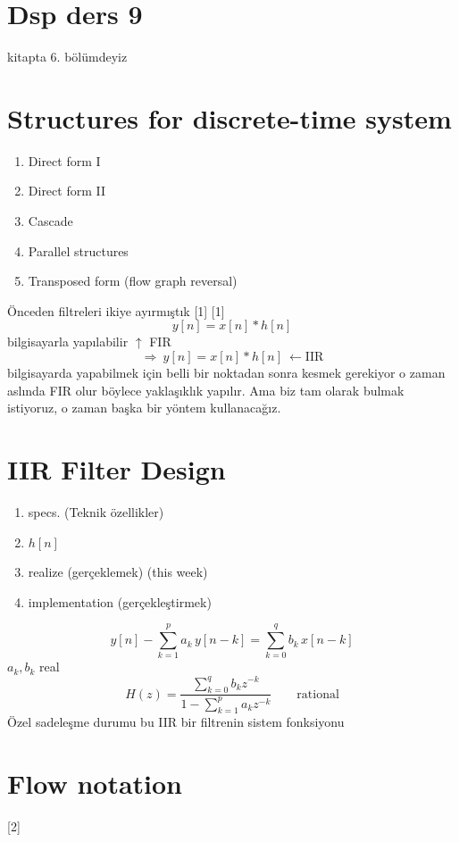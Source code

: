 \documentclass[11pt,a4paper]{article}
\begin{document}

\section{Dsp ders 9}
kitapta 6. bölümdeyiz

\section{Structures for discrete-time system}
\begin{enumerate}[label=\arabic*-]
\item Direct form I
\item Direct form II
\item Cascade
\item Parallel structures
\item Transposed form (flow graph reversal)
\end{enumerate}

Önceden filtreleri ikiye ayırmıştık
[1]
[1]
\[ y[n] = x[n] * h[n] \]
bilgisayarla yapılabilir \quad $\uparrow$ FIR
\[ \Rightarrow\ y[n] = x[n] * h[n] \ \leftarrow \text{IIR} \]
bilgisayarda yapabilmek için belli bir noktadan sonra kesmek gerekiyor o zaman aslında FIR olur böylece yaklaşıklık yapılır.
Ama biz tam olarak bulmak istiyoruz, o zaman başka bir yöntem kullanacağız.

\section{IIR Filter Design}
\begin{enumerate}[label=\arabic*-]
\item specs. (Teknik özellikler)
\item $h[n]$
\item realize (gerçeklemek) \hfill (this week)
\item implementation (gerçekleştirmek)
\end{enumerate}

\[ y[n] - \sum_{k=1}^{p} a_k\, y[n-k] = \sum_{k=0}^{q} b_k\, x[n-k] \]
$a_k, b_k$ real
\[ H(z) = \frac{\sum_{k=0}^{q} b_k z^{-k}}{1 - \sum_{k=1}^{p} a_k z^{-k}} \qquad \text{rational} \]
Özel sadeleşme durumu  bu IIR bir filtrenin sistem fonksiyonu

\section{Flow notation}
[2]
\end{document}
